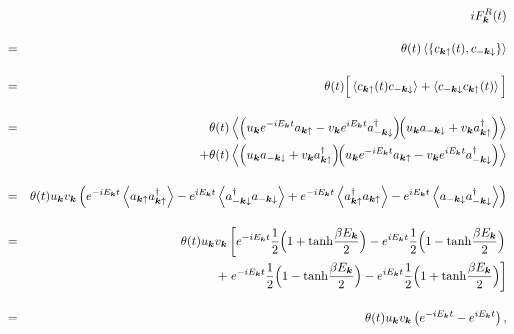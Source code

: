 \documentclass[uplatex,a4j,12pt,dvipdfmx]{jsarticle}
\begin{document}
\begin{eqnarray}
	&&
	i
	F_{\bm{k}}^{R}(t)
	\nonumber \\[4mm] &=&
	\theta(t)
	\left\langle \left\{
	c_{\bm{k} \uparrow}(t), c_{-\bm{k} \downarrow}
	\right\} \right\rangle
	\nonumber \\[4mm] &=&
	\theta(t)
	\Big[
		\left\langle
		c_{\bm{k} \uparrow}(t) c_{-\bm{k} \downarrow}
		\right\rangle
		+
		\left\langle
		c_{-\bm{k} \downarrow} c_{\bm{k} \uparrow}(t)
		\right\rangle
		\Big]
	\nonumber \\[4mm] &=&
	\theta(t)
	\left\langle
	\left(
	u_{\bm{k}} e^{ - i E_{\bm{k}} t }
	a_{\bm{k} \uparrow}
	-
	v_{\bm{k}} e^{ i E_{\bm{k}} t }
	a_{-\bm{k} \downarrow}^{\dagger}
	\right)
	\!\!
	\left(
	u_{\bm{k}} a_{-\bm{k} \downarrow}
	+
	v_{\bm{k}} a_{\bm{k} \uparrow}^{\dagger}
	\right)
	\right\rangle
	\nonumber \\ && \hspace{5mm} +
	\theta(t)
	\left\langle
	\left(
	u_{\bm{k}} a_{-\bm{k} \downarrow}
	+
	v_{\bm{k}} a_{\bm{k} \uparrow}^{\dagger}
	\right)
	\!\!
	\left(
	u_{\bm{k}} e^{ - i E_{\bm{k}} t }
	a_{\bm{k} \uparrow}
	-
	v_{\bm{k}} e^{ i E_{\bm{k}} t }
	a_{-\bm{k} \downarrow}^{\dagger}
	\right)
	\right\rangle
	\nonumber \\[4mm]
	&=&
	\theta(t)
	u_{\bm{k}}
	v_{\bm{k}}
	\left(
	e^{ - i E_{\bm{k}} t }
	\left\langle
	a_{\bm{k} \uparrow}
	a_{\bm{k} \uparrow}^{\dagger}
	\right\rangle
	-
	e^{ i E_{\bm{k}} t }
	\left\langle
	a_{-\bm{k} \downarrow}^{\dagger}
	a_{-\bm{k} \downarrow}
	\right\rangle
	+
	e^{ - i E_{\bm{k}} t }
	\left\langle
	a_{\bm{k} \uparrow}^{\dagger}
	a_{\bm{k} \uparrow}
	\right\rangle
	-
	e^{ i E_{\bm{k}} t }
	\left\langle
	a_{-\bm{k} \downarrow}
	a_{-\bm{k} \downarrow}^{\dagger}
	\right\rangle
	\right)
	\nonumber \\[4mm]
	&=&
	\theta(t)
	u_{\bm{k}}
	v_{\bm{k}}
	\left[
		e^{ - i E_{\bm{k}} t }
		\dfrac{1}{2}
		\Big( 1 + {\rm tanh}\dfrac{\beta E_{\bm{k}}}{2} \Big)
		-
		e^{ i E_{\bm{k}} t }
		\dfrac{1}{2}
		\Big( 1 - {\rm tanh}\dfrac{\beta E_{\bm{k}}}{2} \Big)
		\right.
		\nonumber \\ && \hspace{5mm} +
		\left.
		e^{ - i E_{\bm{k}} t }
		\dfrac{1}{2}
		\Big( 1 - {\rm tanh}\dfrac{\beta E_{\bm{k}}}{2} \Big)
		-
		e^{ i E_{\bm{k}} t }
		\dfrac{1}{2}
		\Big( 1 + {\rm tanh}\dfrac{\beta E_{\bm{k}}}{2} \Big)
		\right]
	\nonumber \\[4mm] &=&
	\theta(t)
	u_{\bm{k}}
	v_{\bm{k}}
	\left(
	e^{ - i E_{\bm{k}} t }
	-
	e^{ i E_{\bm{k}} t }
	\right)
	,
\end{eqnarray}
\end{document}
